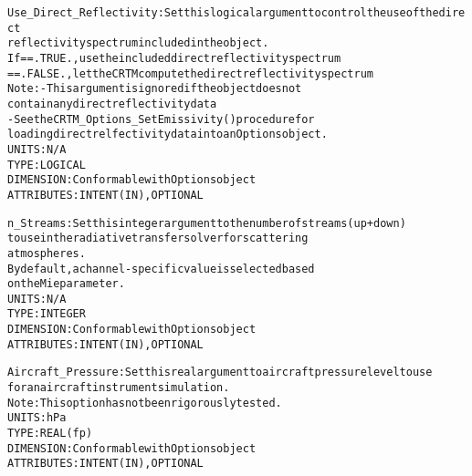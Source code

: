 \begin{alltt}
    Use_Direct_Reflectivity:  Set this logical argument to control the use of the direct
                              reflectivity spectrum included in the object.
                              If == .TRUE. , use the included direct reflectivity spectrum
                                 == .FALSE., let the CRTM compute the direct reflectivity spectrum
                              Note: - This argument is ignored if the object does not
                                      contain any direct reflectivity data
                                    - See the CRTM_Options_SetEmissivity() procedure for
                                      loading direct relfectivity data into an Options object.
                              UNITS:      N/A
                              TYPE:       LOGICAL
                              DIMENSION:  Conformable with Options object
                              ATTRIBUTES: INTENT(IN), OPTIONAL
                           
    n_Streams:                Set this integer argument to the number of streams (up + down)
                              to use in the radiative transfer solver for scattering
                              atmospheres.
                              By default, a channel-specific value is selected based
                              on the Mie parameter.
                              UNITS:      N/A
                              TYPE:       INTEGER
                              DIMENSION:  Conformable with Options object
                              ATTRIBUTES: INTENT(IN), OPTIONAL
                                           
    Aircraft_Pressure:        Set this real argument to aircraft pressure level to use
                              for an aircraft instrument simulation.
                              Note: This option has not been rigorously tested.
                              UNITS:      hPa
                              TYPE:       REAL(fp)
                              DIMENSION:  Conformable with Options object
                              ATTRIBUTES: INTENT(IN), OPTIONAL
                                               
  \end{alltt}
